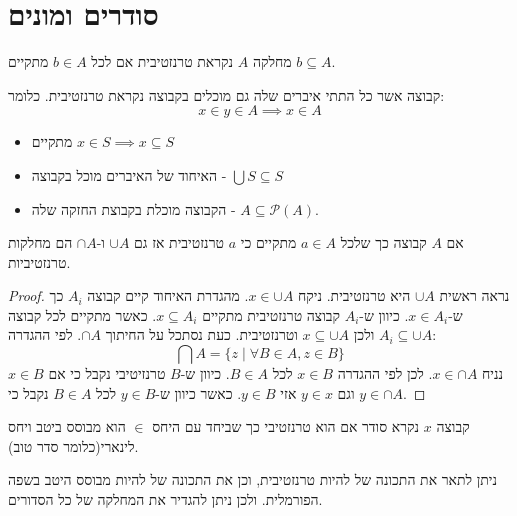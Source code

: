 \documentclass{tstextbook}
\begin{document}
\section{סודרים ומונים}

\begin{definition}
מחלקה \(A\) נקראת טרנזטיבית אם לכל \(b \in A\) מתקיים \(b \subseteq A\).

\end{definition}
\begin{definition}
קבוצה אשר כל התתי איברים שלה גם מוכלים בקבוצה נקראת טרנזטיבית. כלומר:
$$x\in y\in A\implies x\in A$$

\end{definition}
\begin{proposition}
  \begin{itemize}
    \item מתקיים \(x \in S\implies x\subseteq S\)
    \item האיחוד של האיברים מוכל בקבוצה - \(\bigcup S\subseteq S\)
    \item הקבוצה מוכלת בקבוצת החזקה שלה - \(A\subseteq \mathcal{P}(A)\).
  \end{itemize}
\end{proposition}
\begin{proposition}
אם \(A\) קבוצה כך שלכל \(a \in A\) מתקיים כי \(a\) טרנזטיבית אז גם \(\cup A\) ו-\(\cap A\) הם מחלקות טרנזטיביות.

\end{proposition}
\begin{proof}
נראה ראשית \(\cup A\) היא טרנזטיבית. ניקח \(x \in \cup A\). מהגדרת האיחוד קיים קבוצה \(A_{i}\) כך ש-\(x \in A_{i}\). כיוון ש-\(A_{i}\) קבוצה טרנזטיבית מתקיים \(x \subseteq A_{i}\). כאשר מתקיים לכל קבוצה \(A_{i}\subseteq \cup A\) ולכן \(x\subseteq \cup A\) וטרנזטיבית.
כעת נסתכל על החיתוך \(\cap A\). לפי ההגדרה:
$$\bigcap A=\{z\mid\forall B\in A,z\in B\}$$
נניח \(x \in \cap A\). לכן לפי ההגדרה \(x \in B\)  לכל \(B \in A\). כיוון ש-\(B\) טרנזיטיבי נקבל כי אם \(x \in B\) וגם \(y \in x\) אזי \(y \in B\). כאשר כיוון ש-\(y \in B\) לכל \(B \in A\) נקבל כי \(y \in \cap A\).

\end{proof}
\begin{definition}[סודר]
קבוצה \(x\) נקרא סודר אם הוא טרנזטיבי כך שביחד עם היחס \(\in\) הוא מבוסס ביטב ויחס לינארי(כלומר סדר טוב). 

\end{definition}
\begin{remark}
ניתן לתאר את התכונה של להיות טרנזטיבית, וכן את התכונה של להיות מבוסס היטב בשפה הפורמלית. ולכן ניתן להגדיר את המחלקה של כל הסדורים.

\end{remark}
\end{document}
